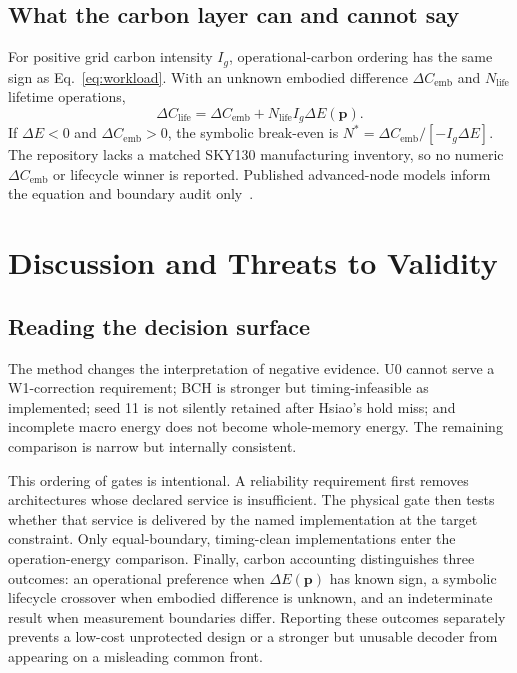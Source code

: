 \documentclass[conference]{IEEEtran}
\begin{document}
\subsection{What the carbon layer can and cannot say}
For positive grid carbon intensity $I_g$, operational-carbon ordering has the
same sign as Eq.~\eqref{eq:workload}. With an unknown embodied difference
$\Delta C_{\mathrm{emb}}$ and $N_{\mathrm{life}}$ lifetime operations,
\begin{equation}
 \Delta C_{\mathrm{life}}=\Delta C_{\mathrm{emb}}+
 N_{\mathrm{life}} I_g\Delta E(\mathbf p).
 \label{eq:carbon}
\end{equation}
If $\Delta E<0$ and $\Delta C_{\mathrm{emb}}>0$, the symbolic break-even is
$N^*=\Delta C_{\mathrm{emb}}/[-I_g\Delta E]$. The repository lacks a matched
SKY130 manufacturing inventory, so no numeric $\Delta C_{\mathrm{emb}}$ or
lifecycle winner is reported. Published advanced-node models inform the
equation and boundary audit only~\cite{gupta2022act,boakes2023,chen2025carbonclarity}.

\section{Discussion and Threats to Validity}
\subsection{Reading the decision surface}
The method changes the interpretation of negative evidence. U0 cannot serve a
W1-correction requirement; BCH is stronger but timing-infeasible as implemented;
seed 11 is not silently retained after Hsiao's hold miss; and incomplete macro
energy does not become whole-memory energy. The remaining comparison is narrow
but internally consistent.

This ordering of gates is intentional. A reliability requirement first removes
architectures whose declared service is insufficient. The physical gate then
tests whether that service is delivered by the named implementation at the
target constraint. Only equal-boundary, timing-clean implementations enter the
operation-energy comparison. Finally, carbon accounting distinguishes three
outcomes: an operational preference when $\Delta E(\mathbf p)$ has known sign,
a symbolic lifecycle crossover when embodied difference is unknown, and an
indeterminate result when measurement boundaries differ. Reporting these
outcomes separately prevents a low-cost unprotected design or a stronger but
unusable decoder from appearing on a misleading common front.
\end{document}
